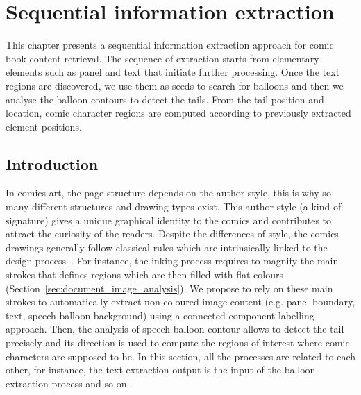 \chapter{Sequential information extraction}%
\label{chap:sequential}
\graphicspath{{./chapters/3-sequential/figs/}}

This chapter presents a sequential information extraction approach for comic book content retrieval.
The sequence of extraction starts from elementary elements such as panel and text that initiate further processing.
Once the text regions are discovered, we use them as seeds to search for balloons and then we analyse the balloon contours to detect the tails.
From the tail position and location, comic character regions are computed according to previously extracted element positions.


\section{Introduction} %
\label{sec:introduction}

In comics art, the page structure depends on the author style, this is why so many different structures and drawing types exist.
This author style (a kind of signature) gives a unique graphical identity to the comics and contributes to attract the curiosity of the readers.
Despite the differences of style, the comics drawings generally follow classical rules which are intrinsically linked to the design process~\cite{mccloud2006Making}.
For instance, the inking process requires to magnify the main strokes that defines regions which are then filled with flat colours (Section~\ref{sec:document_image_analysis}).
We propose to rely on these main strokes to automatically extract non coloured image content (e.g. panel boundary, text, speech balloon background) using a connected-component labelling approach.
Then, the analysis of speech balloon contour allows to detect the tail precisely and its direction is used to compute the regions of interest where comic characters are supposed to be.
In this section, all the processes are related to each other, for instance, the text extraction output is the input of the balloon extraction process and so on.

